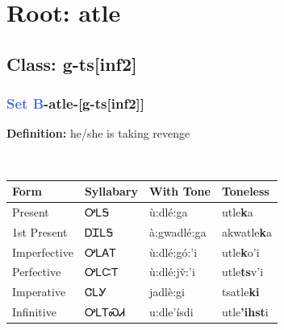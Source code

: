\needspace{4in}
\section*{Root: atle}
\nopagebreak
{}
\needspace{3in}
\subsection*{Class: g-ts[inf2]}
\nopagebreak
\needspace{2in}
\subsubsection*{\textcolor{RoyalBlue}{Set B}{-}\textbf{atle}{-}[g-ts[inf2]]}
\nopagebreak
\textbf{Definition: } he/she is taking revenge
\\[0.5em]
\begin{tabularx}{\textwidth}{l X X X}%
\toprule%
\textbf{Form}&\textbf{Syllabary}&\textbf{With Tone}&\textbf{Toneless}\\%
\midrule%
Present&ᎤᏞᎦ&ù:dlé:ga&utle\textbf{k}a\\%
1st Present&ᎠᏆᏞᎦ&à:gwadlé:ga&akwatle\textbf{k}a\\%
Imperfective&ᎤᏞᎪᎢ&ù:dlé:gó:’i&utle\textbf{k}o'i\\%
Perfective&ᎤᏞᏨᎢ&ù:dlé:jv̌:’i&utle\textbf{ts}v'i\\%
Imperative&ᏣᏞᎩ&jadlè:gi&tsatle\textbf{ki}\\%
Infinitive&ᎤᏞᎢᏍᏗ&u:dle’ísdi&utle\textbf{'ihst}i\\%
\bottomrule%
\end{tabularx}
\\[1em]